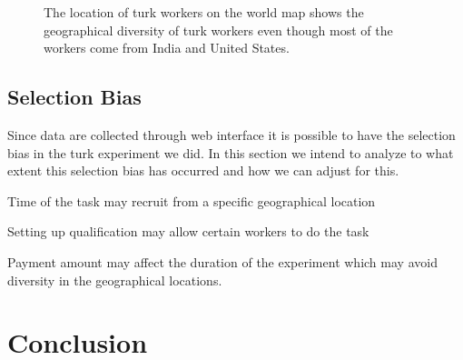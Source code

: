 \documentclass[11pt]{article}
\begin{document}
\begin{figure}[hbtp]
   \centering
       \caption{The location of turk workers on the world map shows the geographical diversity of turk workers even though most of the workers come from India and United States.}
       \label{fig:rsq}
\end{figure}

\subsection{Selection Bias} Since data are collected through web interface it is possible to have the selection bias in the turk experiment we did. In this section we intend to analyze to what extent this selection bias has occurred and how we can adjust for this.


Time of the task may recruit from a specific geographical location

Setting up qualification may allow certain workers to do the task

Payment amount may affect the duration of the experiment which may avoid diversity in the geographical locations.


\section{Conclusion}
\end{document}
